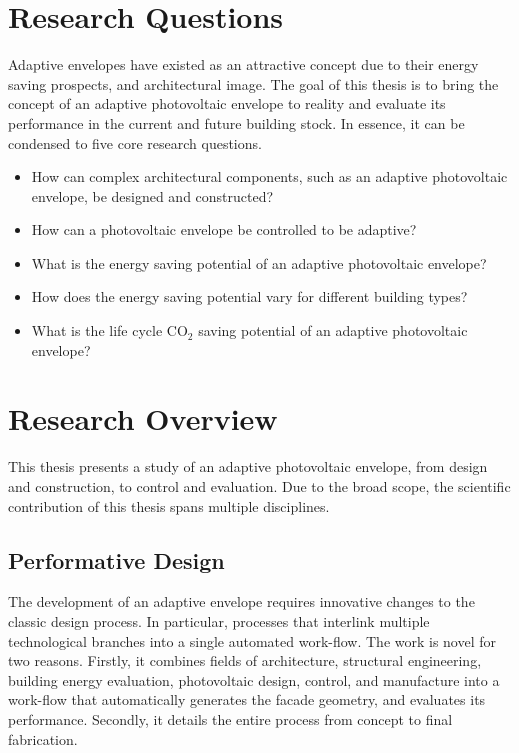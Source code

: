 \section{Research Questions}

Adaptive envelopes have existed as an attractive concept due to their energy saving prospects, and architectural image. The goal of this thesis is to bring the concept of an adaptive photovoltaic envelope to reality and evaluate its performance in the current and future building stock. In essence, it can be condensed to five core research questions.

\begin{itemize}
\item How can complex architectural components, such as an adaptive photovoltaic envelope, be designed and constructed? 
\item How can a photovoltaic envelope be controlled to be adaptive?
\item What is the energy saving potential of an adaptive photovoltaic envelope?
\item How does the energy saving potential vary for different building types?
\item What is the life cycle CO$_2$ saving potential of an adaptive photovoltaic envelope?

\end{itemize}


\section{Research Overview}

This thesis presents a study of an adaptive photovoltaic envelope, from design and construction, to control and evaluation. Due to the broad scope, the scientific contribution of this thesis spans multiple disciplines. 

\subsection{Performative Design}
The development of an adaptive envelope requires innovative changes to the classic design process. In particular, processes that interlink multiple technological branches into a single automated work-flow. The work is novel for two reasons. Firstly, it combines fields of architecture, structural engineering, building energy evaluation, photovoltaic design, control, and manufacture into a work-flow that automatically generates the facade geometry, and evaluates its performance. Secondly, it details the entire process from concept to final fabrication. 


